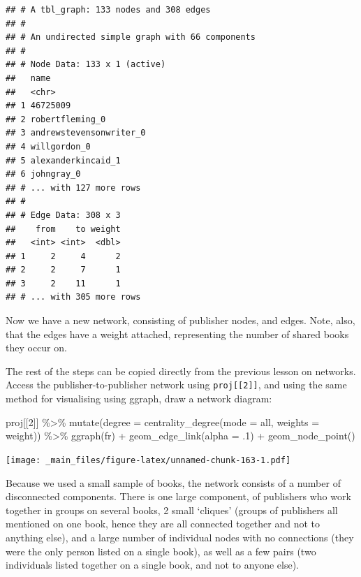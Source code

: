 \documentclass[
]{book}
\newenvironment{Shaded}{\begin{snugshade}}{\end{snugshade}}
\newcommand{\AttributeTok}[1]{\textcolor[rgb]{0.77,0.63,0.00}{#1}}
\newcommand{\DecValTok}[1]{\textcolor[rgb]{0.00,0.00,0.81}{#1}}
\newcommand{\FunctionTok}[1]{\textcolor[rgb]{0.00,0.00,0.00}{#1}}
\newcommand{\NormalTok}[1]{#1}
\newcommand{\SpecialCharTok}[1]{\textcolor[rgb]{0.00,0.00,0.00}{#1}}
\newcommand{\StringTok}[1]{\textcolor[rgb]{0.31,0.60,0.02}{#1}}
\begin{document}
\begin{verbatim}
## # A tbl_graph: 133 nodes and 308 edges
## #
## # An undirected simple graph with 66 components
## #
## # Node Data: 133 x 1 (active)
##   name                   
##   <chr>                  
## 1 46725009               
## 2 robertfleming_0        
## 3 andrewstevensonwriter_0
## 4 willgordon_0           
## 5 alexanderkincaid_1     
## 6 johngray_0             
## # ... with 127 more rows
## #
## # Edge Data: 308 x 3
##    from    to weight
##   <int> <int>  <dbl>
## 1     2     4      2
## 2     2     7      1
## 3     2    11      1
## # ... with 305 more rows
\end{verbatim}

Now we have a new network, consisting of publisher nodes, and edges. Note, also, that the edges have a weight attached, representing the number of shared books they occur on.

The rest of the steps can be copied directly from the previous lesson on networks. Access the publisher-to-publisher network using \texttt{proj{[}{[}2{]}{]}}, and using the same method for visualising using ggraph, draw a network diagram:

\begin{Shaded}
\begin{Highlighting}[]
\NormalTok{proj[[}\DecValTok{2}\NormalTok{]] }\SpecialCharTok{\%\textgreater{}\%} 
  \FunctionTok{mutate}\NormalTok{(}\AttributeTok{degree =} \FunctionTok{centrality\_degree}\NormalTok{(}\AttributeTok{mode =} \StringTok{\textquotesingle{}all\textquotesingle{}}\NormalTok{, }\AttributeTok{weights =}\NormalTok{ weight)) }\SpecialCharTok{\%\textgreater{}\%} 
  \FunctionTok{ggraph}\NormalTok{(}\StringTok{\textquotesingle{}fr\textquotesingle{}}\NormalTok{) }\SpecialCharTok{+} 
  \FunctionTok{geom\_edge\_link}\NormalTok{(}\AttributeTok{alpha =}\NormalTok{ .}\DecValTok{1}\NormalTok{) }\SpecialCharTok{+} 
  \FunctionTok{geom\_node\_point}\NormalTok{()}
\end{Highlighting}
\end{Shaded}

\texttt{[image: \_main\_files/figure-latex/unnamed-chunk-163-1.pdf]}

Because we used a small sample of books, the network consists of a number of disconnected components. There is one large component, of publishers who work together in groups on several books, 2 small `cliques' (groups of publishers all mentioned on one book, hence they are all connected together and not to anything else), and a large number of individual nodes with no connections (they were the only person listed on a single book), as well as a few pairs (two individuals listed together on a single book, and not to anyone else).
\end{document}
